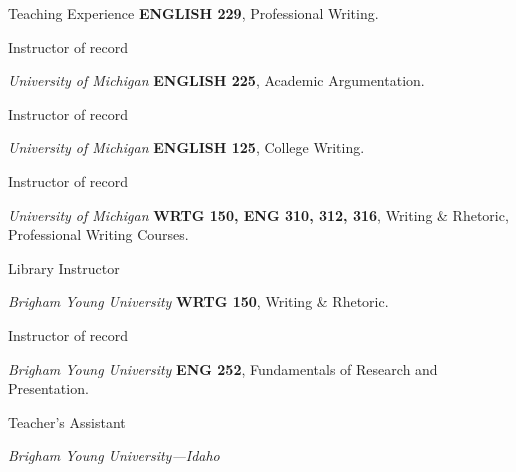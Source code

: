 \begin{rubric}{Teaching Experience}
    \entry*[2022 -- 2023]%
        \textbf{ENGLISH 229}, Professional Writing. 
        \par Instructor of record
        \par\emph{University of Michigan}
    \entry*[2022]%
        \textbf{ENGLISH 225}, Academic Argumentation.
        \par Instructor of record
        \par\emph{University of Michigan}
    \entry*[2019 -- 2022]%
        \textbf{ENGLISH 125}, College Writing.
        \par Instructor of record
        \par\emph{University of Michigan}
    \entry*[2018 -- 2019]%
        \textbf{WRTG 150, ENG 310, 312, 316}, Writing \& Rhetoric, Professional Writing Courses.
        \par Library Instructor
        \par\emph{Brigham Young University}
    \entry*[2016--2018]%
        \textbf{WRTG 150}, Writing \& Rhetoric.
        \par Instructor of record
        \par\emph{Brigham Young University}
    \entry*[2015]%
        \textbf{ENG 252}, Fundamentals of Research and Presentation.
        \par Teacher's Assistant
        \par\emph{Brigham Young University---Idaho}
    \end{rubric}